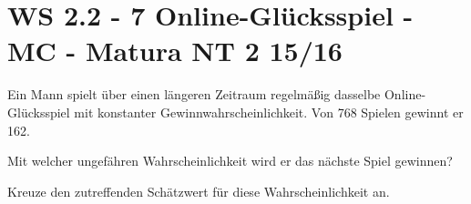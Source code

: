 \section{WS 2.2 - 7 Online-Glücksspiel - MC - Matura NT 2 15/16}

\begin{beispiel}{1} %
Ein Mann spielt über einen längeren Zeitraum regelmäßig dasselbe Online-Glücksspiel mit konstanter Gewinnwahrscheinlichkeit. Von 768 Spielen gewinnt er 162. \leer

Mit welcher ungefähren Wahrscheinlichkeit wird er das nächste Spiel gewinnen?

Kreuze den zutreffenden Schätzwert für diese Wahrscheinlichkeit an. \leer

\end{beispiel}